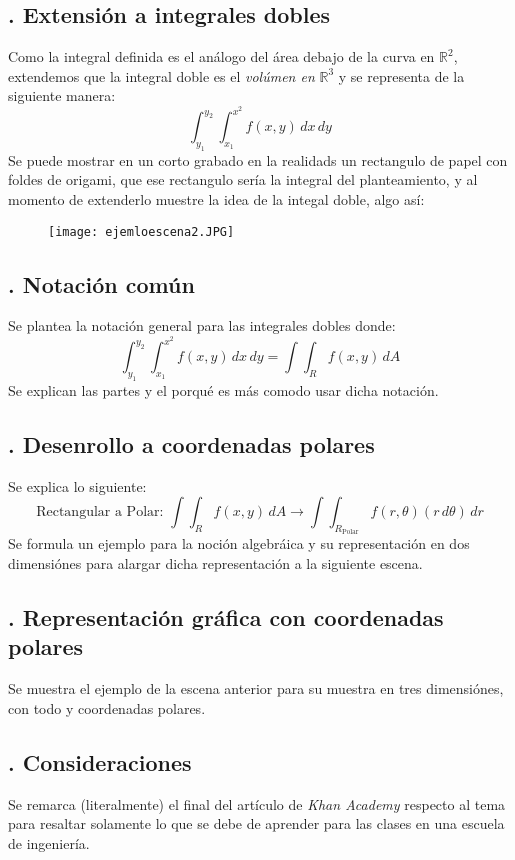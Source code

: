 \documentclass[letterpaper, 12pt]{article}
\begin{document}
\subsection*{{. Extensión a integrales dobles}} \justify
Como la integral definida es el análogo del área debajo de la curva en \(\mathbb{R}^2\), extendemos que la integral doble es el \emph{volúmen en} \(\mathbb{R}^3\) y se representa de la siguiente manera:
\[\int_{y_1}^{y_2}\int_{x_1}^{x^2} f(x,y)\, dx\, dy\]
Se puede mostrar en un corto grabado en la realidads un rectangulo de papel con foldes de origami, que ese rectangulo sería la integral del planteamiento, y al momento de extenderlo muestre la idea de la integal doble, algo así:
\begin{figure}[H]
    \centering
    \texttt{[image: ejemloescena2.JPG]}
\end{figure}
\subsection*{{. Notación común}} \justify
Se plantea la notación general para las integrales dobles donde:
\[\int_{y_1}^{y_2}\int_{x_1}^{x^2} f(x,y)\, dx\, dy=\int\!\!\!\int_{R}f(x,y)\, dA\]
Se explican las partes y el porqué es más comodo usar dicha notación.
\subsection*{{. Desenrollo a coordenadas polares}} \justify
Se explica lo siguiente:
\[\text{Rectangular a Polar: }\int\!\!\!\int_{R}f(x,y)\, dA\rightarrow \int\!\!\!\int_{R_{\text{Polar}}}f(r,\theta)(r\, d\theta)\, dr\]
Se formula un ejemplo para la noción algebráica y su representación en dos dimensiónes para alargar dicha representación a la siguiente escena.
\subsection*{{. Representación gráfica con coordenadas polares}} \justify
Se muestra el ejemplo de la escena anterior para su muestra en tres dimensiónes, con todo y coordenadas polares.
\subsection*{{. Consideraciones}} \justify
Se remarca (literalmente) el final del artículo de \emph{Khan Academy} respecto al tema para resaltar solamente lo que se debe de aprender para las clases en una escuela de ingeniería.
\end{document}
